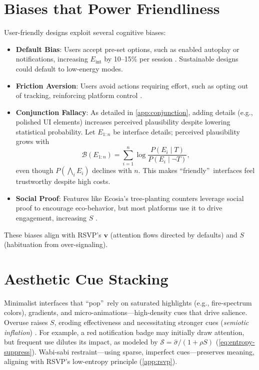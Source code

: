 \documentclass[openany]{book}
\newcommand{\vvec}{\mathbf{v}} %
\newcommand{\Sent}{S} %
\newcommand{\Eint}{E_{\mathrm{int}}} %
\begin{document}
\section{Biases that Power Friendliness}
\label{sec:biases}
User-friendly designs exploit several cognitive biases:
\begin{itemize}
  \item \textbf{Default Bias}: Users accept pre-set options, such as enabled autoplay or notifications, increasing $\Eint$ by 10--15\% per session \citep{colak2024}. Sustainable designs could default to low-energy modes.
  \item \textbf{Friction Aversion}: Users avoid actions requiring effort, such as opting out of tracking, reinforcing platform control \citep{doctorow2022}.
  \item \textbf{Conjunction Fallacy}: As detailed in \cref{app:conjunction}, adding details (e.g., polished UI elements) increases perceived plausibility despite lowering statistical probability. Let $E_{1:n}$ be interface details; perceived plausibility grows with
  \begin{equation}
  \label{eq:believability}
  \mathcal{B}(E_{1:n}) = \sum_{i=1}^n \log\frac{P(E_i \mid T)}{P(E_i \mid \neg T)},
  \end{equation}
  even though $P(\bigwedge_i E_i)$ declines with $n$. This makes \textquotedblleft friendly\textquotedblright\ interfaces feel trustworthy despite high costs.
  \item \textbf{Social Proof}: Features like Ecosia’s tree-planting counters leverage social proof to encourage eco-behavior, but most platforms use it to drive engagement, increasing $\Sent$ \citep{colak2024}.
\end{itemize}
These biases align with RSVP’s $\vvec$ (attention flows directed by defaults) and $\Sent$ (habituation from over-signaling).

\section{Aesthetic Cue Stacking}
\label{sec:aesthetic}
Minimalist interfaces that \textquotedblleft pop\textquotedblright\ rely on saturated highlights (e.g., fire-spectrum colors), gradients, and micro-animations---high-density cues that drive salience. Overuse raises $\Sent$, eroding effectiveness and necessitating stronger cues (\emph{semiotic inflation}) \citep{colak2024}. For example, a red notification badge may initially draw attention, but frequent use dilutes its impact, as modeled by $\mathcal{S} = \widehat{\sigma}/(1+\rho \Sent)$ (\cref{eq:entropy-suppress}). Wabi-sabi restraint---using sparse, imperfect cues---preserves meaning, aligning with RSVP’s low-entropy principle (\cref{app:rsvp}).
\end{document}
